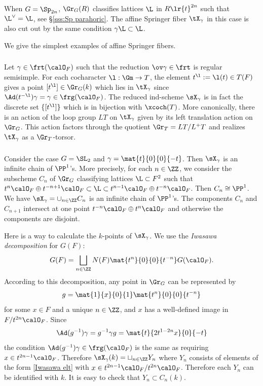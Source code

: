 When $G=\Sp_{2n}$, $\Gr_{G}(R)$ classifies lattices $\L$ in $R\lr{t}^{2n}$ such that $\L^{\vee}=\L$, see \S\ref{sss:Sp parahoric}. The affine Springer fiber $\tX_{\gamma}$ in this case is also cut out by the same condition $\gamma \L\subset \L$. 


We give the simplest examples of affine Springer fibers. 

\subsubsection{}\label{sss:reduction rs} Let $\gamma\in\frt(\calO_{F})$  such that the reduction $\ov\gamma\in\frt$ is regular semisimple. For each cocharacter $\l:\Gm\to T$, the element $t^{\l}:=\l(t)\in T(F)$ gives a point $[t^{\l}]\in \Gr_{G}(k)$ which lies in $\tX_{\gamma}$ since $\Ad(t^{-\l})\gamma=\gamma\in \frg(\calO_{F})$. The reduced ind-scheme $\sX_{\gamma}$ is in fact the discrete set $\{[t^{\l}]\}$ which is in bijection with $\xcoch(T)$. More canonically, there is an action of the loop group $LT$ on $\tX_{\gamma}$ given by its left translation action on $\Gr_{G}$. This action factors through the quotient $\Gr_{T}=LT/L^{+}T$ and realizes $\tX_{\gamma}$ as a $\Gr_{T}$-torsor.

\subsubsection{}\label{P1 chain} Consider the case $G=\SL_{2}$ and $\gamma=\mat{t}{0}{0}{-t}$. Then $\sX_{\gamma}$ is an infinite chain of $\PP^{1}$'s. More precisely, for each $n\in\ZZ$, we consider the subscheme $C_{n}$ of $\Gr_{G}$ classifying lattices $\L\subset F^{2}$ such that $t^{n}\calO_{F}\oplus t^{-n+1}\calO_{F} \subset \L\subset t^{n-1}\calO_{F}\oplus t^{-n}\calO_{F}$. Then $C_{n}\cong\PP^{1}$. We have $\sX_{\gamma}=\cup_{n\in\ZZ}C_{n}$ is an infinite chain of $\PP^{1}$'s. The components  $C_{n}$ and $C_{n+1}$ intersect at one point $t^{-n}\calO_{F}\oplus t^{n}\calO_{F}$ and otherwise the components are disjoint.

Here is a way to calculate the $k$-points of $\sX_{\gamma}$. We use the {\em Iwasawa decomposition} for $G(F)$: 
\begin{equation*}
G(F)=\bigsqcup_{n\in\ZZ}N(F)\mat{t^{n}}{0}{0}{t^{-n}}G(\calO_{F}).
\end{equation*}
According to this decomposition, any point in $\Gr_{G}$ can be represented by
\begin{equation}\label{Iwasawa elt}
g=\mat{1}{x}{0}{1}\mat{t^{n}}{0}{0}{t^{-n}}
\end{equation}
for some  $x\in F$ and a unique $n\in\ZZ$, and $x$ has a well-defined image in $F/t^{2n}\calO_{F}$. Since
\begin{equation*}
\Ad(g^{-1})\gamma=g^{-1}\gamma g=\mat{t}{2t^{1-2n}x}{0}{-t}
\end{equation*}
the condition $\Ad(g^{-1})\gamma\in\frg(\calO_{F})$ is the same as requiring $x\in t^{2n-1}\calO_{F}$. Therefore $\sX_{\gamma}(k)=\sqcup_{n\in\ZZ}Y_{n}$ where $Y_{n}$ consists of elements of the form \eqref{Iwasawa elt}  with $x\in t^{2n-1}\calO_{F}/t^{2n}\calO_{F}$. Therefore each $Y_{n}$ can be identified with $k$. It is easy to check that $Y_{n}\subset C_{n}(k)$.


